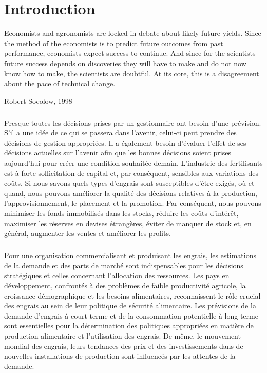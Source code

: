 \chapter*{Introduction}
\epigraph{Economists and agronomists are locked in debate about likely
future yields. Since the method of the economists is to predict
future outcomes from past performance, economists expect
success to continue. And since for the scientists future success
depends on discoveries they will have to make and do not now
know how to make, the scientists are doubtful. At its core, this is
a disagreement about the pace of technical change.}{Robert
Socolow, 1998}
\paragraph{}
Presque toutes les décisions prises par un gestionnaire ont besoin d'une prévision. S'il a une idée de ce qui se passera dans l'avenir, celui-ci peut prendre des décisions de gestion appropriées. Il a également besoin d'évaluer l'effet de ses décisions actuelles sur l'avenir afin que les bonnes décisions soient prises aujourd'hui pour créer une condition souhaitée demain. L’industrie des fertilisants est à forte sollicitation de capital et, par conséquent, sensibles aux variations des coûts. Si nous savons quels types d'engrais sont susceptibles d'être exigés, où et quand, nous pouvons améliorer la qualité des décisions relatives à la production, l'approvisionnement, le placement et la promotion. Par conséquent, nous pouvons minimiser les fonds immobilisés dans les stocks, réduire les coûts d'intérêt, maximiser les réserves en devises étrangères, éviter de manquer de stock et, en général, augmenter les ventes et améliorer les profits.
\paragraph{}
Pour une organisation commercialisant et produisant les engrais, les estimations de la demande et des parts de marché sont indispensables pour les décisions stratégiques et celles concernant l'allocation des ressources. Les pays en développement, confrontés à des problèmes de faible productivité agricole, la croissance démographique et les besoins alimentaires, reconnaissent le rôle crucial des engrais au sein de leur politique de sécurité alimentaire. Les prévisions de la demande d'engrais à court terme et de la consommation potentielle à long terme sont essentielles pour la détermination des politiques appropriées en matière de production alimentaire et l'utilisation des engrais. De même, le mouvement mondial des engrais, leurs tendances des prix et des investissements dans de nouvelles installations de production sont influencés par les attentes de la demande.
